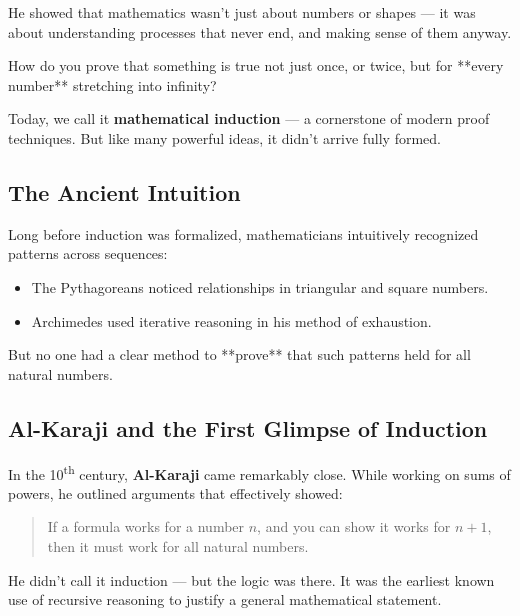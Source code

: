 He showed that mathematics wasn’t just about numbers or shapes — it was about understanding processes that never end, and making sense of them anyway.

\begin{tcolorbox}[colback=blue!5!white, colframe=blue!50!black, title={Historical Sidebar: Mathematical Induction — Proving Forever, One Step at a Time}, breakable]

    How do you prove that something is true not just once, or twice, but for **every number** stretching into infinity?
    
    Today, we call it \textbf{mathematical induction} — a cornerstone of modern proof techniques. But like many powerful ideas, it didn’t arrive fully formed.
    
    \subsection*{The Ancient Intuition}
    
    Long before induction was formalized, mathematicians intuitively recognized patterns across sequences:
    
    \begin{itemize}
      \item The Pythagoreans noticed relationships in triangular and square numbers.
      \item Archimedes used iterative reasoning in his method of exhaustion.
    \end{itemize}
    
    But no one had a clear method to **prove** that such patterns held for all natural numbers.
    
    \subsection*{Al-Karaji and the First Glimpse of Induction}
    
    In the 10\textsuperscript{th} century, \textbf{Al-Karaji} came remarkably close. While working on sums of powers, he outlined arguments that effectively showed:
    
    \begin{quote}
    If a formula works for a number \( n \), and you can show it works for \( n + 1 \),  
    then it must work for all natural numbers.
    \end{quote}
    
    He didn’t call it induction — but the logic was there. It was the earliest known use of recursive reasoning to justify a general mathematical statement.
    

\end{tcolorbox}
